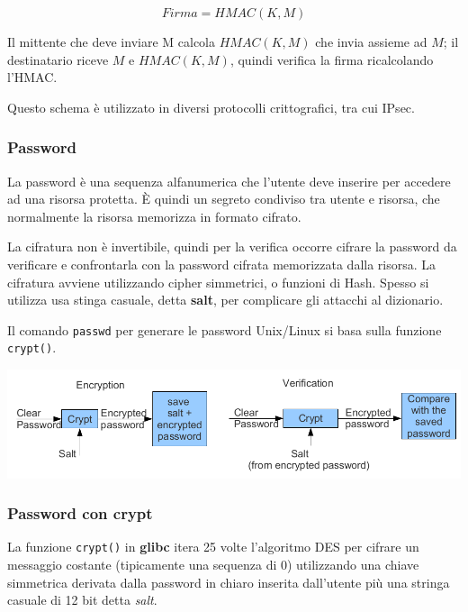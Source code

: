             \begin{equation*}
                Firma = HMAC(K,M)
            \end{equation*}

            Il mittente che deve inviare M calcola $HMAC(K,M)$ che invia assieme ad $M$; il destinatario riceve $M$ e $HMAC(K,M)$, quindi verifica la firma ricalcolando l'HMAC.

            Questo schema è utilizzato in diversi protocolli crittografici, tra cui IPsec.

            

        \subsubsection{Password}
            La password è una sequenza alfanumerica che l'utente deve inserire per accedere ad una risorsa protetta. È quindi un segreto condiviso tra utente e risorsa, che normalmente la risorsa memorizza in formato cifrato.
        
            La cifratura non è invertibile, quindi per la verifica occorre cifrare la password da verificare e confrontarla con la password cifrata memorizzata dalla risorsa. La cifratura avviene utilizzando cipher simmetrici, o funzioni di Hash. Spesso si utilizza usa stinga casuale, detta \textbf{salt}, per complicare gli attacchi al dizionario.
        
            Il comando \verb|passwd| per generare le password Unix/Linux si basa sulla funzione \verb|crypt()|.
        
            \begin{center}
                \includegraphics[scale=0.35]{chapters/7/assets/schema_o.png}
            \end{center}

        \subsubsection{Password con crypt}
            La funzione \verb|crypt()| in \textbf{glibc} itera 25 volte l'algoritmo DES per cifrare un messaggio costante (tipicamente una sequenza di 0) utilizzando una chiave simmetrica derivata dalla password in chiaro inserita dall'utente più una stringa casuale di 12 bit detta \textit{salt}.
        

